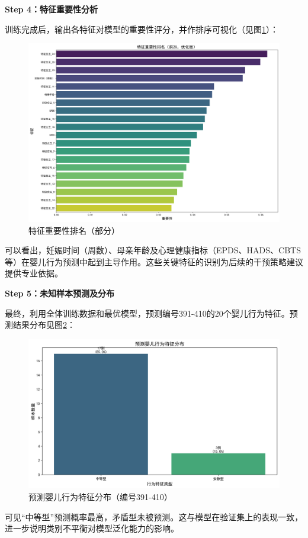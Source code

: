 \documentclass[withoutpreface,bwprint]{cumcmthesis}
\begin{document}
\textbf{Step 4：特征重要性分析}

训练完成后，输出各特征对模型的重要性评分，并作排序可视化（见图\ref{fig:feature-importance}）：
\begin{figure}[htbp]
    \centering
    \includegraphics[width=1\textwidth]{figures/feature_importance.png}
    \caption{特征重要性排名（部分）}
    \label{fig:feature-importance}
\end{figure}
可以看出，妊娠时间（周数）、母亲年龄及心理健康指标（EPDS、HADS、CBTS等）在婴儿行为预测中起到主导作用。这些关键特征的识别为后续的干预策略建议提供专业依据。

\textbf{Step 5：未知样本预测及分布}

最终，利用全体训练数据和最优模型，预测编号391-410的20个婴儿行为特征。预测结果分布见图\ref{fig:predict-dist}：
\begin{figure}[H]
    \centering
    \includegraphics[width=1\textwidth]{figures/预测婴儿行为特征分布.png}
    \caption{预测婴儿行为特征分布（编号391-410）}
    \label{fig:predict-dist}
\end{figure}
可见“中等型”预测概率最高，矛盾型未被预测。这与模型在验证集上的表现一致，进一步说明类别不平衡对模型泛化能力的影响。
\end{document}
